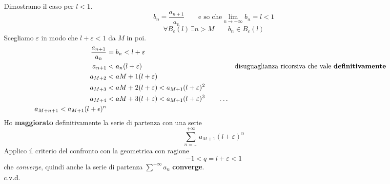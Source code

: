 \documentclass[../dimostrazioni]{subfiles}
\begin{document}
            Dimostramo il caso per \(l < 1\). 
            \[b_n = \frac{a_{n+1}}{a_n} \qquad \text{e so che} \lim_{n \to +\infty}b_n = l < 1 \] 
            \[\forall B_\varepsilon (l) \, \exists n > M \qquad b_n \in B_\varepsilon (l) \]
            Scegliamo \(\varepsilon\) in modo che \(l + \varepsilon < 1 \) da \(M\) in poi.
            \begin{align*}
                \frac{a_{n+1}}{a_n} &= b_n < l + \varepsilon \\
                a_{n+1} &< a_n(l + \varepsilon) && \text{disuguaglianza ricorsiva che vale \textbf{definitivamente}} \\
                a_{M+2} &< a{M+1} (l + \varepsilon) \\
                a_{M+3} &< a{M+2} (l + \varepsilon) < a_{M+1}(l + \varepsilon)^{2}\\
                a_{M+4} &< a{M+3} (l + \varepsilon) < a_{M+1}(l + \varepsilon)^{3}
                \qquad \dots \\
                a_{M+n+1}< a_{M+1}(l + \epsilon)^{n}
            \end{align*}
            Ho \textbf{maggiorato} definitivamente la serie di partenza con una serie
            \[ \sum_{n=\dots}^{+\infty} a_{M+1}(l + \varepsilon)^{n}\] 
            Applico il criterio del confronto con la geometrica con ragione
            \[-1 < q = l + \varepsilon < 1 \]
            che \emph{converge}, quindi anche la serie di partenza \(\sum_{}^{+\infty} a_n \) \textbf{converge}. \\
            c.v.d. 




                        
\end{document}
